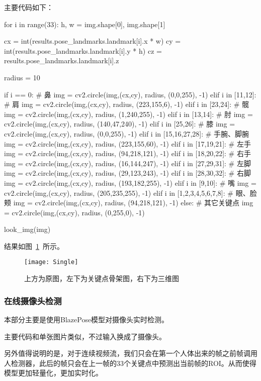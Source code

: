 主要代码如下：
\begin{python}
for i in range(33):
  h, w = img.shape[0], img.shape[1]
  
  cx = int(results.pose_landmarks.landmark[i].x * w)
  cy = int(results.pose_landmarks.landmark[i].y * h)
  cz = results.pose_landmarks.landmark[i].z

  radius = 10

  if i == 0: # 鼻
    img = cv2.circle(img,(cx,cy), radius, (0,0,255), -1)
  elif i in [11,12]: # 肩
    img = cv2.circle(img,(cx,cy), radius, (223,155,6), -1)
  elif i in [23,24]: # 髋
    img = cv2.circle(img,(cx,cy), radius, (1,240,255), -1)
  elif i in [13,14]: # 肘
    img = cv2.circle(img,(cx,cy), radius, (140,47,240), -1)
  elif i in [25,26]: # 膝
    img = cv2.circle(img,(cx,cy), radius, (0,0,255), -1)
  elif i in [15,16,27,28]: # 手腕、脚腕
    img = cv2.circle(img,(cx,cy), radius, (223,155,60), -1)
  elif i in [17,19,21]: # 左手
    img = cv2.circle(img,(cx,cy), radius, (94,218,121), -1)
  elif i in [18,20,22]: # 右手
    img = cv2.circle(img,(cx,cy), radius, (16,144,247), -1)
  elif i in [27,29,31]: # 左脚
    img = cv2.circle(img,(cx,cy), radius, (29,123,243), -1)
  elif i in [28,30,32]: # 右脚
    img = cv2.circle(img,(cx,cy), radius, (193,182,255), -1)
  elif i in [9,10]: # 嘴
    img = cv2.circle(img,(cx,cy), radius, (205,235,255), -1)
  elif i in [1,2,3,4,5,6,7,8]: # 眼、脸颊
    img = cv2.circle(img,(cx,cy), radius, (94,218,121), -1)
  else: # 其它关键点
    img = cv2.circle(img,(cx,cy), radius, (0,255,0), -1)

look_img(img)
\end{python}

结果如图~\ref{picture:18}~所示。

\begin{figure}
\centering
\texttt{[image: Single]}
\caption{上方为原图，左下为关键点骨架图，右下为三维图}
\label{picture:18}
\end{figure}

\subsubsection{在线摄像头检测}

本部分主要是使用BlazePose模型对摄像头实时检测。

主要代码和单张图片类似，不过输入换成了摄像头。

另外值得说明的是，对于连续视频流，我们只会在第一个人体出来的帧之前帧调用人检测器，此后的帧只会在上一帧的33个关键点中预测出当前帧的ROI。从而使得模型更加轻量化，更加实时化。

